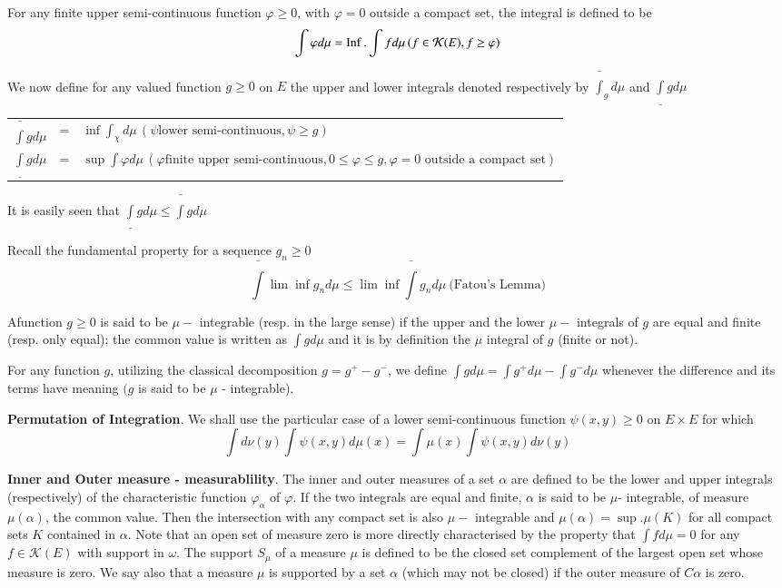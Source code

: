 For any finite upper semi-continuous function $\varphi \ge 0$, with
$\varphi = 0$ outside a compact set, the integral is defined to be 
$$
\int \varphi d \mu = \operatorname{Inf} . \int f d \mu \,(f \in \mathcal{K} (E), f \ge
\varphi) 
$$

We now define for any valued function $g \ge 0$ on $E$ the upper and
lower integrals denoted respectively by $\bar{\int} _g  d \mu$ and
$\underline{\int} g d \mu$ 

\begin{tabular}{rcp{8cm}}
   $\bar{\int } g d \mu$ & = & $\inf \int _\chi  d \mu \,( \psi \text{
    lower semi-continuous}, \psi \ge g)$\\ 
  $\underline{\int } g  d \mu$ & = & $\sup \int \varphi d \mu \,( \varphi 
  \text {finite upper semi-continuous}, 0 \le \varphi \le g, \varphi =
  0 \text{ outside a compact set})$ 
\end{tabular}

It is easily seen that $\underline{\int} g d \mu \le \bar{\int} g d \mu$

Recall the fundamental property for a sequence $g_n \ge 0$
$$
\bar{\int} \lim \inf g_n d \mu \le \lim \inf \bar{\int} g_n d \mu
~\text{(Fatou's Lemma)} 
$$

\begin{defn}\label{p3:chap1:sec2:def2} %
  A\pageoriginale function $g \ge 0$ is said to be $\mu-$ integrable (resp. in the
  large sense) if the upper and the lower $\mu-$ integrals of $g$ are
  equal and finite (resp. only equal); the common value is written as
  $\int g d \mu$ and it is by definition the $\mu$ integral of $g$
  (finite or not). 

  For any function $g$, utilizing the classical decomposition $g = g^+
  - g^-$, we define $\int g d \mu = \int g^+ d \mu - \int g^- d \mu$
  whenever the difference and its terms have meaning $(g$ is said to
  be $\mu$ - integrable). 
\end{defn}

\noindent
\textbf{Permutation of Integration}. We shall use the particular case
of a 	lower semi-continuous function $\psi (x, y ) \ge 0$ on $E \times
E$ for which 
$$
\int d \nu (y) \int \psi (x, y) d \mu (x) = \int \mu (x) \int \psi (x,
y) d \nu (y) 
$$

\noindent
\textbf{Inner and Outer measure - measurablility}. The inner and outer
measures of a set $\alpha$ are defined to be the lower and upper
integrals (respectively) of the characteristic function
$\varphi_\alpha$ of $\varphi$. If the two integrals are equal and
finite, $\alpha$ is said to be $\mu$- integrable, of measure $\mu
(\alpha)$, the common value. Then the intersection with any compact
set is also $\mu-$ integrable and $\mu (\alpha) = \sup. \mu (K)$ for
all compact sets $K$ contained in $\alpha$. Note that an open set of
measure zero is more directly characterised by the property that $\int
f d \mu = 0$ for any $f \in \mathcal{K} (E)$ with support in
$\omega$. The support $S_\mu$ of a measure $\mu$ is defined to be the
closed set complement of the largest open set whose measure is
zero. We say also that a measure $\mu$ is supported by a set $\alpha$
(which may not be closed) if the outer measure of $C \alpha$ is zero. 

